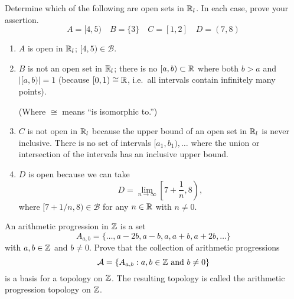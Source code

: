 \documentclass[twocolumn, noxcolor, maketitle]{mathnotes-hw}
\def\basis{\mathcal{B}}
\begin{document}
\begin{problem}[1.12]
  Determine which of the following are open sets in $\mathbb{R}_l$. In each case, prove
  your assertion.
  \[ A = [4,5)
    \quad B = \{3\}
    \quad C = [1,2]
    \quad D = (7,8) \]
\end{problem}
\begin{enumerate}
  \item $A$ is open in $\mathbb{R}_l$; $[4,5) \in \basis$.
  \item $B$ is not an open set in $\mathbb{R}_l$; there is no $[a, b) \subset \mathbb{R}$ where
    both $b > a$ and $|[a, b)| = 1$ (because $[0,1) \cong \mathbb{R}$, i.e.~all
    intervals contain infinitely many points).

    (Where $\cong$ means ``is isomorphic to.'')
  \item $C$ is not open in $\mathbb{R}_l$ because the upper bound of an open set in
    $\mathbb{R}_l$ is never inclusive. There is no set of intervals $[a_1, b_1), \dots$
    where the union or intersection of the intervals has an inclusive upper bound.
  \item $D$ is open because we can take
    \[ D = \lim_{n\to\infty} \left[7 + \frac{1}{n}, 8\right), \]
    where $[7 + 1/n, 8) \in \basis$ for any $n \in \mathbb{R}$ with $n \ne 0$.
\end{enumerate}

\pagebreak
\begin{problem}[1.15]
  An arithmetic progression in $\mathbb{Z}$ is a set
  \[ A_{a,b} = \{\dots, a - 2b, a - b, a, a + b, a + 2b, \dots\} \]
  with $a,b \in \mathbb{Z}$ and $b \ne 0$. Prove that the collection of arithmetic
  progressions
  \[ \mathcal{A} = \{ A_{a,b} : a, b \in \mathbb{Z} \text{ and } b \ne 0 \} \]
  is a basis for a topology on $\mathbb{Z}$. The resulting topology is called the
  arithmetic progression topology on $\mathbb{Z}$.
\end{problem}
\end{document}
